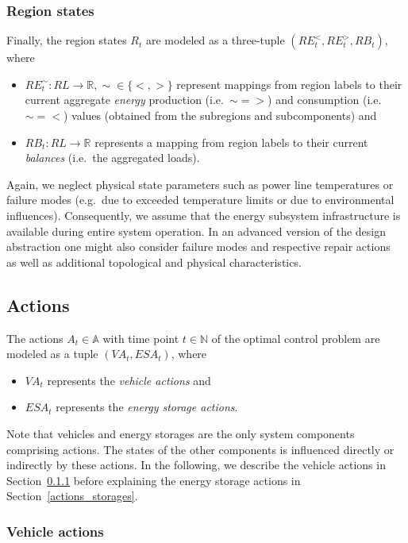 \subsubsection{Region states}
\label{states_regions}

Finally, the region states $R_t$ are modeled as a three-tuple $(RE_t^<, RE_t^>, RB_t)$, where
\begin{itemize}
	\item $RE_t^\sim: RL \rightarrow \mathbb{R}, \sim \in \{<,>\}$ represent mappings from region labels to their current aggregate \textit{energy} production (i.e.\ $\sim = >$) and consumption (i.e.\ $\sim = <$) values (obtained from the subregions and subcomponents) and
	\item $RB_t: RL \rightarrow \mathbb{R}$ represents a mapping from region labels to their current \textit{balances} (i.e.\ the aggregated loads).
\end{itemize}
Again, we neglect physical state parameters such as power line temperatures or failure modes (e.g.\ due to exceeded temperature limits or due to environmental influences). Consequently, we assume that the energy subsystem infrastructure is available during entire system operation. In an advanced version of the design abstraction one might also consider failure modes and respective repair actions~\cite{anghel2007stochastic} as well as additional topological and physical characteristics.

\subsection{Actions}
\label{actions}

The actions $A_t \in \mathbb{A}$ with time point $t \in \mathbb{N}$ of the optimal control problem are modeled as a tuple $(VA_t, ESA_t)$, where
\begin{itemize}
	\item $VA_t$ represents the \textit{vehicle actions} and
	\item $ESA_t$ represents the \textit{energy storage actions}.
\end{itemize}
Note that vehicles and energy storages are the only system components comprising actions. The states of the other components is influenced directly or indirectly by these actions. In the following, we describe the vehicle actions in Section~\ref{actions_vehicles} before explaining the energy storage actions in Section~\ref{actions_storages}.

\subsubsection{Vehicle actions}
\label{actions_vehicles}

